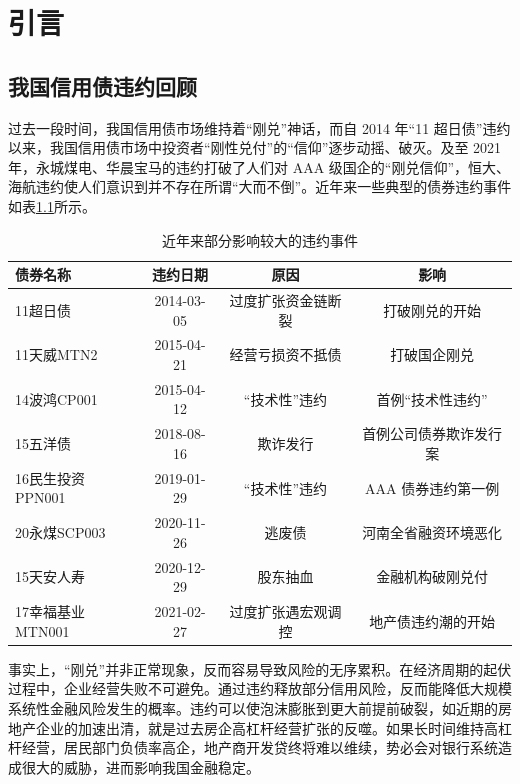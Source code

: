 
\chapter{引言}

\section{我国信用债违约回顾}

过去一段时间，我国信用债市场维持着“刚兑”神话，而自 2014 年“11 超日债”违约以来，我国信用债市场中投资者“刚性兑付”的“信仰”逐步动摇、破灭。及至 2021 年，永城煤电、华晨宝马的违约打破了人们对 AAA 级国企的“刚兑信仰”，恒大、海航违约使人们意识到并不存在所谓“大而不倒”。近年来一些典型的债券违约事件如表\ref{tab:defaults_in_history}所示。

\begin{table}[ht]
	\caption{近年来部分影响较大的违约事件}
	\centering
	\begin{tabular}{lccc}
		\toprule
		债券名称         & 违约日期       & 原因        & 影响          \\ \midrule
		11超日债        & 2014-03-05 & 过度扩张资金链断裂 & 打破刚兑的开始     \\
		11天威MTN2     & 2015-04-21 & 经营亏损资不抵债  & 打破国企刚兑      \\
		14波鸿CP001    & 2015-04-12 & “技术性”违约   & 首例“技术性违约”   \\
		15五洋债        & 2018-08-16 & 欺诈发行      & 首例公司债券欺诈发行案 \\
		16民生投资PPN001 & 2019-01-29 & “技术性”违约   & AAA 债券违约第一例 \\
		20永煤SCP003   & 2020-11-26 & 逃废债       & 河南全省融资环境恶化  \\
		15天安人寿       & 2020-12-29 & 股东抽血      & 金融机构破刚兑付    \\
		17幸福基业MTN001 & 2021-02-27 & 过度扩张遇宏观调控 & 地产债违约潮的开始   \\
		\bottomrule
	\end{tabular}
	\label{tab:defaults_in_history}
\end{table}
事实上，“刚兑”并非正常现象，反而容易导致风险的无序累积。在经济周期的起伏过程中，企业经营失败不可避免。通过违约释放部分信用风险，反而能降低大规模系统性金融风险发生的概率。违约可以使泡沫膨胀到更大前提前破裂，如近期的房地产企业的加速出清，就是过去房企高杠杆经营扩张的反噬。如果长时间维持高杠杆经营，居民部门负债率高企，地产商开发贷终将难以维续，势必会对银行系统造成很大的威胁，进而影响我国金融稳定。

